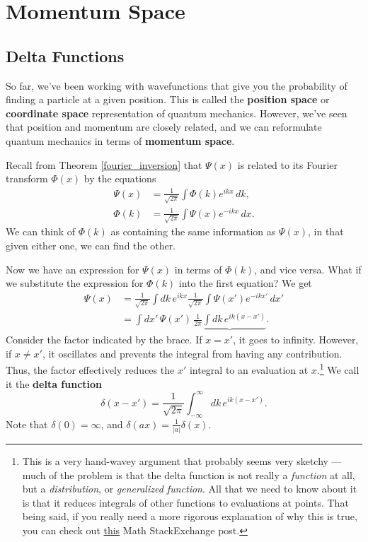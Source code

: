 \section{Momentum Space}
\subsection{Delta Functions}\label{delta_functions}

So far, we've been working with wavefunctions that give you the probability of finding a particle at a given position. This is called the \textbf{position space} or \textbf{coordinate space} representation of quantum mechanics. However, we've seen that position and momentum are closely related, and we can reformulate quantum mechanics in terms of \textbf{momentum space}.

Recall from Theorem \ref{fourier_inversion} that $\Psi(x)$ is related to its Fourier transform $\Phi(x)$ by the equations \begin{align*}\Psi(x)&=\frac{1}{\sqrt{2\pi}}\int\Phi(k)e^{ikx}\,dk,\\\Phi(k)&=\frac{1}{\sqrt{2\pi}}\int\Psi(x)e^{-ikx}\,dx.\end{align*}We can think of $\Phi(k)$ as containing the same information as $\Psi(x)$, in that given either one, we can find the other.

Now we have an expression for $\Psi(x)$ in terms of $\Phi(k)$, and vice versa. What if we substitute the expression for $\Phi(k)$ into the first equation? We get \begin{align*}\Psi(x)&=\frac{1}{\sqrt{2\pi}}\int dk\,e^{ikx}\frac{1}{\sqrt{2\pi}}\int\Psi(x')e^{-ikx'}\,dx'\\&=\int dx'\,\Psi(x')\,\underbrace{\frac{1}{2\pi}\int dk\,e^{ik(x-x')}}.\end{align*}Consider the factor indicated by the brace. If $x=x'$, it goes to infinity. However, if $x\neq x'$, it oscillates and prevents the integral from having any contribution. Thus, the factor effectively reduces the $x'$ integral to an evaluation at $x$.\footnote{This is a very hand-wavey argument that probably seems very sketchy --- much of the problem is that the delta function is not really a \textit{function} at all, but a \textit{distribution}, or \textit{generalized function}. All that we need to know about it is that it reduces integrals of other functions to evaluations at points. That being said, if you really need a more rigorous explanation of why this is true, you can check out \href{https://math.stackexchange.com/questions/2340094/why-frac12-pi-int-infty-inftyeiwt-xdw-is-the-dirac-delta-func?noredirect=1&lq=1}{this} Math StackExchange post.} We call it the \textbf{delta function} $$\delta(x-x')=\frac{1}{\sqrt{2\pi}}\int_{-\infty}^{\infty}dk\,e^{ik(x-x')}.$$Note that $\delta(0)=\infty$, and $\delta(ax)=\frac{1}{|a|}\delta(x)$.

